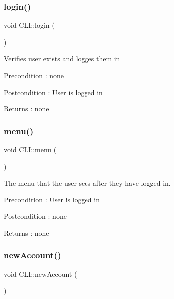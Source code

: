 \subsubsection{\texorpdfstring{login()}{login()}}
{\footnotesize\ttfamily void C\+L\+I\+::login (\begin{DoxyParamCaption}{ }\end{DoxyParamCaption})}

Verifies user exists and logges them in \begin{DoxyPrecond}{Precondition}
\+: none 
\end{DoxyPrecond}
\begin{DoxyPostcond}{Postcondition}
\+: User is logged in 
\end{DoxyPostcond}
\begin{DoxyReturn}{Returns}
\+: none 
\end{DoxyReturn}
\mbox{\label{class_c_l_i_acbbc753079ff02e87dd31e5b3f3bcbf9}} 
\subsubsection{\texorpdfstring{menu()}{menu()}}
{\footnotesize\ttfamily void C\+L\+I\+::menu (\begin{DoxyParamCaption}{ }\end{DoxyParamCaption})}

The menu that the user sees after they have logged in. \begin{DoxyPrecond}{Precondition}
\+: User is logged in 
\end{DoxyPrecond}
\begin{DoxyPostcond}{Postcondition}
\+: none 
\end{DoxyPostcond}
\begin{DoxyReturn}{Returns}
\+: none 
\end{DoxyReturn}
\mbox{\label{class_c_l_i_a87779d0cdc7d0d54839bfacdc0b27e9e}} 
\subsubsection{\texorpdfstring{new\+Account()}{newAccount()}}
{\footnotesize\ttfamily void C\+L\+I\+::new\+Account (\begin{DoxyParamCaption}{ }\end{DoxyParamCaption})}

